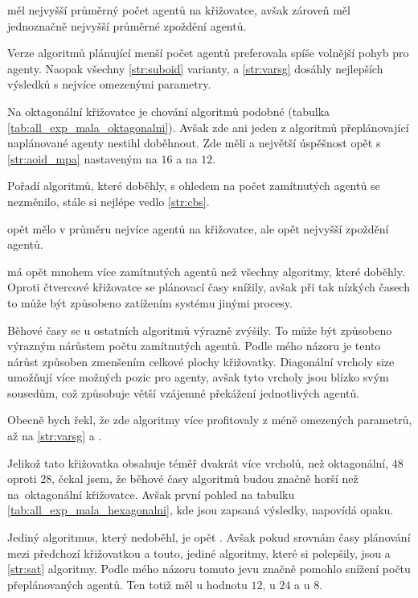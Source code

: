  měl nejvyšší průměrný počet agentů na křižovatce,
avšak zároveň měl jednoznačně nejvyšší průměrné zpoždění agentů.

Verze algoritmů plánující menší počet agentů preferovala spíše volnější pohyb pro agenty.
Naopak všechny \ref{str:suboid} varianty,  a \ref{str:varsg} dosáhly nejlepších výsledků s nejvíce omezenými parametry.



Na oktagonální křižovatce je chování algoritmů podobné (tabulka \ref{tab:all_exp_mala_oktagonalni}).
Avšak zde ani jeden z algoritmů přeplánovající naplánované agenty nestihl doběhnout.
Zde měli  a 
největší úspěšnost opět s \ref{str:aoid_mpa} nastaveným na $16$ a  na $12$.

Pořadí algoritmů, které doběhly, s ohledem na počet zamítnutých agentů se nezměnilo,
stále si nejlépe vedlo \ref{str:cbs}.

 opět mělo v průměru nejvíce agentů na křižovatce, ale opět nejvyšší zpoždění agentů.

 má opět mnohem více zamítnutých agentů než všechny algoritmy, které doběhly.
Oproti čtvercové křižovatce se plánovací časy snížily,
avšak při tak nízkých časech to může být způsobeno zatížením systému jinými procesy.

Běhové časy se u ostatních algoritmů výrazně zvýšily.
To může být způsobeno výrazným nárůstem počtu zamítnutých agentů.
Podle mého názoru je tento nárůst způsoben zmenšením celkové plochy křižovatky.
Diagonální vrcholy size umožňují více možných pozic pro agenty,
avšak tyto vrcholy jsou blízko svým sousedům, což způsobuje větší vzájemné překážení jednotlivých agentů.

Obecně bych řekl, že zde algoritmy více profitovaly z méně omezených parametrů,
až na \ref{str:varsg} a .



Jelikož tato křižovatka obsahuje téměř dvakrát více vrcholů, než oktagonální, $48$ oproti $28$, čekal jsem,
že běhové časy algoritmů budou značně horší než na~oktagonální křižovatce.
Avšak první pohled na tabulku \ref{tab:all_exp_mala_hexagonalni}, kde jsou zapsaná výsledky, napovídá opaku.

Jediný algoritmus, který nedoběhl, je opět .
Avšak pokud srovnám časy plánování mezi předchozí křižovatkou a touto, jediné algoritmy, které si polepšily,
jsou  a \ref{str:sat} algoritmy.
Podle mého názoru tomuto jevu značně pomohlo snížení počtu přeplánovaných agentů.
Ten totiž měl u  hodnotu $12$,
u  $24$ a u  $8$.

